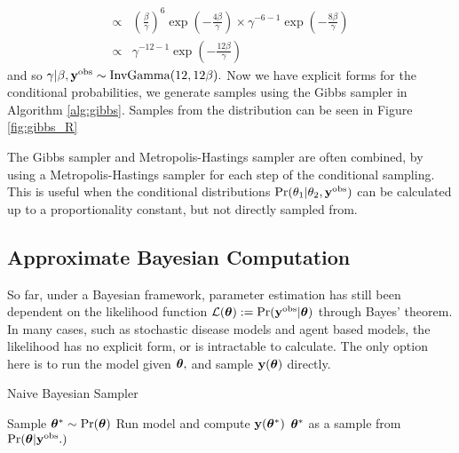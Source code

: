 \begin{example}
\begin{align*}
        \propto &
        \left(\frac{\beta}{\gamma}\right)^{6}
        \exp( -\frac{4\beta}{\gamma})
        \times \gamma^{- 6 - 1}\exp\left(-\frac{8\beta}{\gamma}\right) \\
        \propto & \gamma^{- 12 - 1}
        \exp\left(-\frac{12\beta}{\gamma}\right)
    \end{align*}
    and so
    $\gamma|\beta, \mathbf{y}^{\mathrm{obs}}
        \sim \mathrm{InvGamma}(12, 12\beta).$
    Now we have explicit forms for the conditional probabilities,
    we generate samples using the Gibbs sampler in Algorithm \ref{alg:gibbs}.
    Samples from the distribution can be seen in Figure \ref{fig:gibbs_R}
\end{example}

The Gibbs sampler and Metropolis-Hastings sampler are often combined, by
using a Metropolis-Hastings sampler for each step of the conditional sampling.
This is useful when the conditional distributions
$\Pr(\theta_1 | \theta_2, \mathbf{y}^{\mathrm{obs}})$ can be calculated up to a proportionality
constant, but not directly sampled from.

\subsection*{Approximate Bayesian Computation}

So far, under a Bayesian framework, parameter estimation has still been
dependent on the likelihood function
$\mathcal{L}(\bm{\theta}) := \Pr(\mathbf{y}^{\mathrm{obs}}|\bm{\theta})$ through Bayes' theorem.
In many cases, such as stochastic disease models and agent based models, the
likelihood has no explicit form, or is intractable to calculate.
The only option here is to run the model given $\bm{\theta},$
and sample $\mathbf{y}(\bm{\theta})$ directly.

\begin{algorithm}[htbp]
    \caption{Naive Bayesian Sampler}
    \label{alg:naive_samp}
    \begin{algorithmic}
        \State Sample $\bm{\theta}^\ast \sim \Pr(\bm{\theta})$
        \State Run model and compute $\mathbf{y}(\bm{\theta}^\ast)$
        \If{$\by(\btheta^\ast) = \by^\obs$}
        \State \Return $\bm{\theta}^\ast$ as a sample from $\Pr(\bm{\theta}|\mathbf{y}^{\mathrm{obs}}.)$
        \EndIf
    \end{algorithmic}
\end{algorithm}

